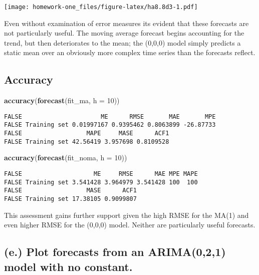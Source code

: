 \documentclass[openany]{book}
\newenvironment{Shaded}{\begin{snugshade}}{\end{snugshade}}
\newcommand{\DataTypeTok}[1]{\textcolor[rgb]{0.13,0.29,0.53}{#1}}
\newcommand{\DecValTok}[1]{\textcolor[rgb]{0.00,0.00,0.81}{#1}}
\newcommand{\KeywordTok}[1]{\textcolor[rgb]{0.13,0.29,0.53}{\textbf{#1}}}
\newcommand{\NormalTok}[1]{#1}
\begin{document}
\texttt{[image: homework-one\_files/figure-latex/ha8.8d3-1.pdf]}

Even without examination of error measures its evident that these forecasts are not particularly useful. The moving average forecast begins accounting for the trend, but then deteriorates to the mean; the (0,0,0) model simply predicts a static mean over an obviously more complex time series than the forecasts reflect.

\hypertarget{accuracy}{%
\subsection{Accuracy}\label{accuracy}}

\begin{Shaded}
\begin{Highlighting}[]
\KeywordTok{accuracy}\NormalTok{(}\KeywordTok{forecast}\NormalTok{(fit_ma, }\DataTypeTok{h =} \DecValTok{10}\NormalTok{))}
\end{Highlighting}
\end{Shaded}

\begin{verbatim}
FALSE                      ME      RMSE       MAE       MPE
FALSE Training set 0.01997167 0.9395462 0.8063899 -26.87733
FALSE                  MAPE     MASE      ACF1
FALSE Training set 42.56419 3.957698 0.8109528
\end{verbatim}

\begin{Shaded}
\begin{Highlighting}[]
\KeywordTok{accuracy}\NormalTok{(}\KeywordTok{forecast}\NormalTok{(fit_noma, }\DataTypeTok{h =} \DecValTok{10}\NormalTok{))}
\end{Highlighting}
\end{Shaded}

\begin{verbatim}
FALSE                    ME     RMSE      MAE MPE MAPE
FALSE Training set 3.541428 3.964979 3.541428 100  100
FALSE                  MASE      ACF1
FALSE Training set 17.38105 0.9099807
\end{verbatim}

This assessment gains further support given the high RMSE for the MA(1) and even higher RMSE for the (0,0,0) model. Neither are particularly useful forecasts.

\hypertarget{e.-plot-forecasts-from-an-arima021-model-with-no-constant.}{%
\subsection{(e.) Plot forecasts from an ARIMA(0,2,1) model with no constant.}\label{e.-plot-forecasts-from-an-arima021-model-with-no-constant.}}
\end{document}
